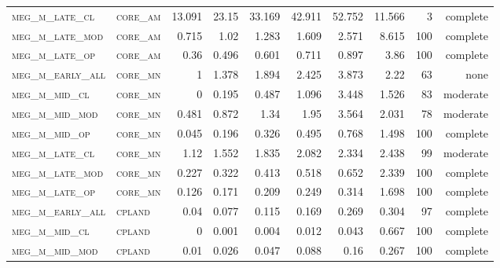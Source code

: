 \begin{landscape}
\begin{center}
\begin{footnotesize}
\begin{longtable}{llrrrrr|rrr}
\textsc{meg\_m\_late\_cl  } & \textsc{core\_am  }    & 13.091   & 23.15    & 33.169   & 42.911   & 52.752     & 11.566        & 3             & complete             \\
\textsc{meg\_m\_late\_mod } & \textsc{core\_am  }    & 0.715    & 1.02     & 1.283    & 1.609    & 2.571      & 8.615         & 100           & complete             \\
\textsc{meg\_m\_late\_op  } & \textsc{core\_am  }    & 0.36     & 0.496    & 0.601    & 0.711    & 0.897      & 3.86          & 100           & complete             \\
\textsc{meg\_m\_early\_all} & \textsc{core\_mn  }    & 1        & 1.378    & 1.894    & 2.425    & 3.873      & 2.22          & 63            & none              \\
\textsc{meg\_m\_mid\_cl   } & \textsc{core\_mn  }    & 0        & 0.195    & 0.487    & 1.096    & 3.448      & 1.526         & 83            & moderate              \\
\textsc{meg\_m\_mid\_mod  } & \textsc{core\_mn  }    & 0.481    & 0.872    & 1.34     & 1.95     & 3.564      & 2.031         & 78            & moderate              \\
\textsc{meg\_m\_mid\_op   } & \textsc{core\_mn  }    & 0.045    & 0.196    & 0.326    & 0.495    & 0.768      & 1.498         & 100           & complete             \\
\textsc{meg\_m\_late\_cl  } & \textsc{core\_mn  }    & 1.12     & 1.552    & 1.835    & 2.082    & 2.334      & 2.438         & 99            & moderate              \\
\textsc{meg\_m\_late\_mod } & \textsc{core\_mn  }    & 0.227    & 0.322    & 0.413    & 0.518    & 0.652      & 2.339         & 100           & complete             \\
\textsc{meg\_m\_late\_op  } & \textsc{core\_mn  }    & 0.126    & 0.171    & 0.209    & 0.249    & 0.314      & 1.698         & 100           & complete             \\
\textsc{meg\_m\_early\_all} & \textsc{cpland    }    & 0.04     & 0.077    & 0.115    & 0.169    & 0.269      & 0.304         & 97            & complete              \\
\textsc{meg\_m\_mid\_cl   } & \textsc{cpland    }    & 0        & 0.001    & 0.004    & 0.012    & 0.043      & 0.667         & 100           & complete             \\
\textsc{meg\_m\_mid\_mod  } & \textsc{cpland    }    & 0.01     & 0.026    & 0.047    & 0.088    & 0.16       & 0.267         & 100           & complete             \\

\end{longtable}
\end{footnotesize}
\end{center}
\end{landscape}
